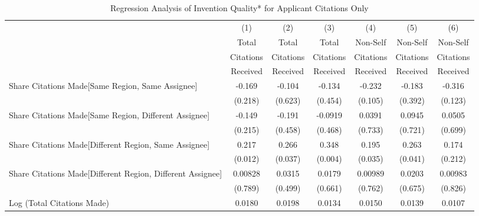 \documentclass[12pt,letterpaper]{article}
\begin{document}
\begin{table}[htbp]\centering \caption{Regression Analysis of Invention Quality* for Applicant Citations Only \label{ainf.model123192021}}
\scriptsize
\singlespacing
\begin{tabular}{l*{6}{c}} \hline
                &\multicolumn{1}{c}{(1)}&\multicolumn{1}{c}{(2)}&\multicolumn{1}{c}{(3)}&\multicolumn{1}{c}{(4)}&\multicolumn{1}{c}{(5)}&\multicolumn{1}{c}{(6)}\\
                &\multicolumn{1}{c}{Total}&\multicolumn{1}{c}{Total}&\multicolumn{1}{c}{Total}&\multicolumn{1}{c}{Non-Self}&\multicolumn{1}{c}{Non-Self}&\multicolumn{1}{c}{Non-Self}\\
                &\multicolumn{1}{c}{Citations}&\multicolumn{1}{c}{Citations}&\multicolumn{1}{c}{Citations}&\multicolumn{1}{c}{Citations}&\multicolumn{1}{c}{Citations}&\multicolumn{1}{c}{Citations}\\
                 &\multicolumn{1}{c}{Received}&\multicolumn{1}{c}{Received}&\multicolumn{1}{c}{Received}&\multicolumn{1}{c}{Received}&\multicolumn{1}{c}{Received}&\multicolumn{1}{c}{Received}\\
\hline
Share Citations Made[Same Region, Same Assignee]&   -0.169         &   -0.104         &   -0.134&-0.232         &   -0.183         &   -0.316 \\
                &   (0.218)         &  (0.623)         &  (0.454)&   (0.105)         &  (0.392)         &  (0.123) \\
Share Citations Made[Same Region, Different Assignee]&    -0.149         &   -0.191         &  -0.0919&    0.0391         &   0.0945         &   0.0505 \\
                &   (0.215)         &  (0.458)         &  (0.468) &   (0.733)         &  (0.721)         &  (0.699) \\
Share Citations Made[Different Region, Same Assignee]&     0.217  &    0.266  &    0.348&    0.195  &    0.263  &    0.174 \\
                &(0.012)         &  (0.037)         &  (0.004) &   (0.035)         &  (0.041)         &  (0.212)\\
Share Citations Made[Different Region, Different Assignee]&  0.00828         &   0.0315         &   0.0179&   0.00989         &   0.0203         &  0.00983  \\
                &  (0.789)         &  (0.499)         &  (0.661)&    (0.762)         &  (0.675)         &  (0.826)         \\
Log (Total Citations Made)&    0.0180&   0.0198&   0.0134&     0.0150&   0.0139  &   0.0107 \\

\end{tabular}
\end{table}
\end{document}
